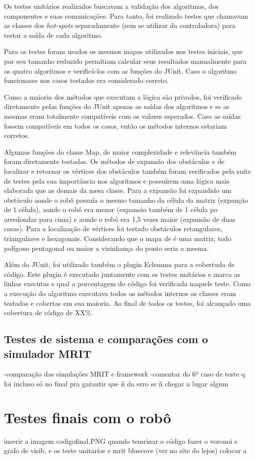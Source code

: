 Os testes unitários realizados buscavam a validação dos algoritmos, dos componentes e suas comunicações. Para tanto, foi realizado testes que chamavam as classes dos \textit{hot-spots} separadamente (sem se utilizar da controladora) para testar a saída de cada algoritmo.

Para os testes foram usados os mesmos mapas utilizados nos testes iniciais, que por seu tamanho reduzido permitiam calcular seus resultados manualmente para os quatro algoritmos e verificá-los com as funções do JUnit. Caso o algoritmo funcionasse nos casos testados era considerado correto.

Como a maioria dos métodos que executam a lógica são privados, foi verificado diretamente pelas funções do JUnit apenas as saídas dos algoritmos e se as mesmas eram totalmente compatíveis com os valores esperados. Caso as saídas fossem compatíveis em todos os casos, então os métodos internos estariam corretos.

Algumas funções do classe Map, de maior complexidade e relevãncia também foram diretamente testadas. Os métodos de expansão dos obstáculos e de localizar e retornar os vértices dos obstáculos também foram verificados pela suíte de testes pela sua importância nos algoritmos e possuírem uma lógica mais elaborada que as demais da mesa classe. Para a expansão foi expandido um obstáculo aonde o robô possuía o mesmo tamanho da célula da matriz (expanção de 1 célula), aonde o robô era menor (expansão também de 1 célula po arredondar para cima) e aonde o robô era 1,5 vezes maior (expansão de duas casas). Para a localização de vértices foi testado obstáculos retangulares, triangulares e hexagonais. Considerando que o mapa de é uma matriz, todo polígono pentagonal ou maior a vizinhança do ponto seria a mesma.

Além do JUnit, foi utilizado também o plugin Eclemma para a cobertuda de código. Este plugin é executado juntamente com os testes unitários e marca as linhas executas e qual a porcentagem do código foi verificada naquele teste. Como a execução do algoritmo executava todos os métodos internos as classes eram testadas e cobertas em sua maioria. Ao final de todos os testes, foi alcançado uma cobertura de código de XX\%.

\subsection{Testes de sistema e comparações com o simulador MRIT}

-comparação das simulações MRIT e framework
-comentar do 6º caso de teste q foi incluso só no final pra garantir que ñ da erro se ñ chegar a lugar algum

\section{Testes finais com o robô}

inserir a imagem codigofinal.PNG quando temrinar o código
fazer o voronoi e grafo de visib. e os teste unitarios e mrit 
bluecove (ver no site do lejos)
colocar a %